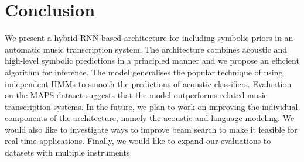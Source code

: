 \documentclass{article}
\begin{document}
\section{Conclusion}

We present a hybrid RNN-based architecture for including symbolic priors in an automatic music transcription system. The architecture combines acoustic and high-level symbolic predictions in a principled manner and we propose an efficient algorithm for inference. The model generalises the popular technique of using independent HMMs to smooth the predictions of acoustic classifiers. Evaluation on the MAPS dataset suggests that the model outperforms related music transcription systems. In the future, we plan to work on improving the individual components of the architecture, namely the acoustic and language modeling. We would also like to investigate ways to improve beam search to make it feasible for real-time applications. Finally, we would like to expand our evaluations to datasets with multiple instruments. 





{}

\end{document}
